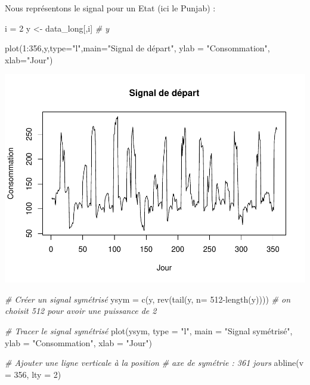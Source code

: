 \documentclass[
]{article}
\newenvironment{Shaded}{\begin{snugshade}}{\end{snugshade}}
\newcommand{\AttributeTok}[1]{\textcolor[rgb]{0.77,0.63,0.00}{#1}}
\newcommand{\CommentTok}[1]{\textcolor[rgb]{0.56,0.35,0.01}{\textit{#1}}}
\newcommand{\DecValTok}[1]{\textcolor[rgb]{0.00,0.00,0.81}{#1}}
\newcommand{\FunctionTok}[1]{\textcolor[rgb]{0.00,0.00,0.00}{#1}}
\newcommand{\NormalTok}[1]{#1}
\newcommand{\OtherTok}[1]{\textcolor[rgb]{0.56,0.35,0.01}{#1}}
\newcommand{\SpecialCharTok}[1]{\textcolor[rgb]{0.00,0.00,0.00}{#1}}
\newcommand{\StringTok}[1]{\textcolor[rgb]{0.31,0.60,0.02}{#1}}
\begin{document}
Nous représentons le signal pour un Etat (ici le Punjab) :

\begin{Shaded}
\begin{Highlighting}[]
\NormalTok{i }\OtherTok{=} \DecValTok{2}
\NormalTok{y }\OtherTok{\textless{}{-}}\NormalTok{  data\_long[,i]}
\CommentTok{\# y}

\FunctionTok{plot}\NormalTok{(}\DecValTok{1}\SpecialCharTok{:}\DecValTok{356}\NormalTok{,y,}\AttributeTok{type=}\StringTok{"l"}\NormalTok{,}\AttributeTok{main=}\StringTok{"Signal de départ"}\NormalTok{, }\AttributeTok{ylab =} \StringTok{"Consommation"}\NormalTok{, }\AttributeTok{xlab=}\StringTok{"Jour"}\NormalTok{)}
\end{Highlighting}
\end{Shaded}

\includegraphics{Projet_CHESNAIS_GUIBERT_files/figure-latex/unnamed-chunk-20-1.pdf}

\begin{Shaded}
\begin{Highlighting}[]
\CommentTok{\# Créer un signal symétrisé}
\NormalTok{ysym }\OtherTok{=} \FunctionTok{c}\NormalTok{(y, }\FunctionTok{rev}\NormalTok{(}\FunctionTok{tail}\NormalTok{(y, }\AttributeTok{n=} \DecValTok{512}\SpecialCharTok{{-}}\FunctionTok{length}\NormalTok{(y)))) }\CommentTok{\# on choisit 512 pour avoir une puissance de 2}

\CommentTok{\# Tracer le signal symétrisé}
\FunctionTok{plot}\NormalTok{(ysym, }\AttributeTok{type =} \StringTok{"l"}\NormalTok{, }\AttributeTok{main =} \StringTok{"Signal symétrisé"}\NormalTok{, }
     \AttributeTok{ylab =} \StringTok{"Consommation"}\NormalTok{, }\AttributeTok{xlab =} \StringTok{"Jour"}\NormalTok{)}

\CommentTok{\# Ajouter une ligne verticale à la position}
\CommentTok{\# axe de symétrie : 361 jours}
\FunctionTok{abline}\NormalTok{(}\AttributeTok{v =} \DecValTok{356}\NormalTok{, }\AttributeTok{lty =} \DecValTok{2}\NormalTok{)}
\end{Highlighting}
\end{Shaded}
\end{document}
